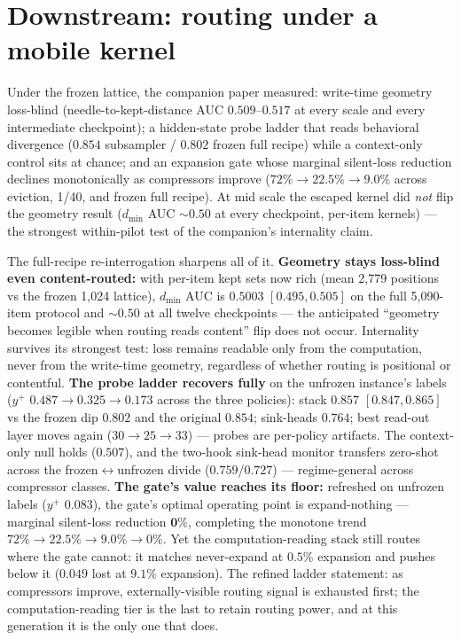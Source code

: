 \documentclass[11pt]{article}
\begin{document}
\section{Downstream: routing under a mobile kernel}
\label{sec:downstream}

Under the frozen lattice, the companion paper measured: write-time
geometry loss-blind (needle-to-kept-distance AUC $0.509$--$0.517$ at
every scale and every intermediate checkpoint); a hidden-state probe
ladder that reads behavioral divergence ($0.854$ subsampler /
$0.802$ frozen full recipe) while a context-only control sits at chance;
and an expansion gate whose marginal silent-loss reduction declines
monotonically as compressors improve ($72\% \to 22.5\% \to 9.0\%$
across eviction, 1/40, and frozen full recipe). At mid scale the escaped
kernel did \emph{not} flip the geometry result ($d_{\min}$ AUC
${\sim}0.50$ at every checkpoint, per-item kernels) --- the strongest
within-pilot test of the companion's internality claim.

The full-recipe re-interrogation sharpens all of it.
\textbf{Geometry stays loss-blind even content-routed:} with per-item
kept sets now rich (mean 2{,}779 positions vs the frozen 1{,}024
lattice), $d_{\min}$ AUC is $0.5003$ $[0.495, 0.505]$ on the full
5{,}090-item protocol and ${\sim}0.50$ at all twelve checkpoints ---
the anticipated ``geometry becomes legible when routing reads content''
flip does not occur. Internality survives its strongest test: loss
remains readable only from the computation, never from the write-time
geometry, regardless of whether routing is positional or contentful.
\textbf{The probe ladder recovers fully} on the unfrozen instance's
labels ($y^{+}$ $0.487 \to 0.325 \to 0.173$ across the three
policies): stack $0.857$ $[0.847, 0.865]$ vs the frozen dip $0.802$ and
the original $0.854$; sink-heads $0.764$; best read-out layer moves
again ($30 \to 25 \to 33$) --- probes are per-policy artifacts. The
context-only null holds ($0.507$), and the two-hook sink-head monitor
transfers zero-shot across the frozen$\leftrightarrow$unfrozen divide
($0.759$/$0.727$) --- regime-general across compressor classes.
\textbf{The gate's value reaches its floor:} refreshed on unfrozen
labels ($y^{+}$ $0.083$), the gate's optimal operating point is
expand-nothing --- marginal silent-loss reduction $\mathbf{0\%}$,
completing the monotone trend $72\% \to 22.5\% \to 9.0\% \to 0\%$.
Yet the computation-reading stack still routes where the gate cannot:
it matches never-expand at $0.5\%$ expansion and pushes below it
($0.049$ lost at $9.1\%$ expansion). The refined ladder statement: as compressors improve,
externally-visible routing signal is exhausted first; the
computation-reading tier is the last to retain routing power, and at
this generation it is the only one that does.
\end{document}
